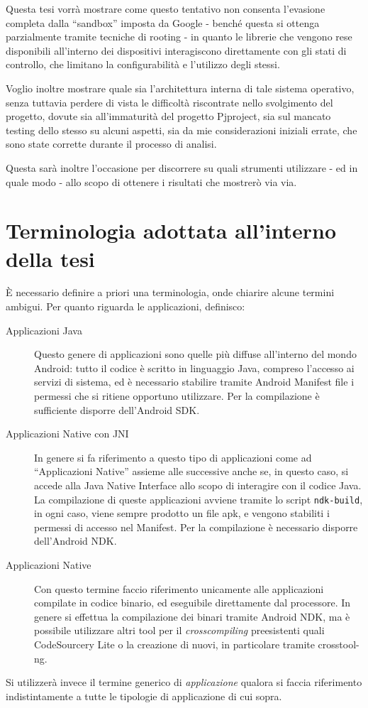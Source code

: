 Questa tesi vorrà mostrare come questo tentativo non consenta l'evasione completa
dalla ``sandbox'' imposta da Google - benché questa si ottenga parzialmente
tramite tecniche di rooting - in quanto le librerie che vengono rese disponibili
all'interno dei dispositivi interagiscono direttamente con gli stati di controllo,
che limitano la configurabilità e l'utilizzo degli stessi.

Voglio inoltre mostrare quale sia l'architettura interna di tale sistema operativo,
senza tuttavia perdere di vista le difficoltà riscontrate nello svolgimento
del progetto, dovute sia all'immaturità del progetto Pjproject, sia sul mancato
testing dello stesso su alcuni aspetti, sia da mie considerazioni iniziali errate,
che sono state corrette durante il processo di analisi.

Questa sarà inoltre l'occasione per discorrere su quali strumenti utilizzare - ed 
in quale modo - allo scopo di ottenere i risultati che mostrerò via via.



\section{Terminologia adottata all'interno della tesi}
È necessario definire a priori una terminologia, onde chiarire alcune termini
ambigui. Per quanto riguarda le applicazioni, definisco:
\begin{description}
\item[Applicazioni Java] Questo genere di applicazioni sono quelle più diffuse
	all'interno del mondo Android: tutto il codice è scritto in linguaggio 
	Java, compreso l'accesso ai servizi di sistema, ed è necessario stabilire
	tramite Android Manifest file i permessi che si ritiene opportuno 
	utilizzare. Per la compilazione è sufficiente disporre dell'Android
	SDK.
\item[Applicazioni Native con JNI] In genere si fa riferimento a questo tipo di
	applicazioni come ad ``Applicazioni Native'' assieme alle successive
	\parencite[vedi][27-54]{libro:games} anche se, in questo caso, si
	accede alla Java Native Interface allo scopo di interagire con il codice Java. 
	La compilazione di queste applicazioni avviene tramite lo script 
	\texttt{\small ndk-build}, in ogni caso, viene sempre prodotto un file apk, 
	e vengono stabiliti i permessi di accesso nel Manifest. Per la compilazione 
	è necessario disporre dell'Android NDK.
\item[Applicazioni Native] Con questo termine faccio riferimento unicamente
	alle applicazioni compilate in codice binario, ed eseguibile direttamente
	dal processore. In genere si effettua la compilazione dei binari tramite
	Android NDK, ma è possibile utilizzare altri tool per il \textit{crosscompiling} preesistenti
	quali CodeSourcery Lite o la creazione di nuovi, in particolare tramite 
	crosstool-ng.
\end{description}
Si utilizzerà invece il termine generico di \textit{applicazione} qualora si faccia
riferimento indistintamente a tutte le tipologie di applicazione di cui sopra.

